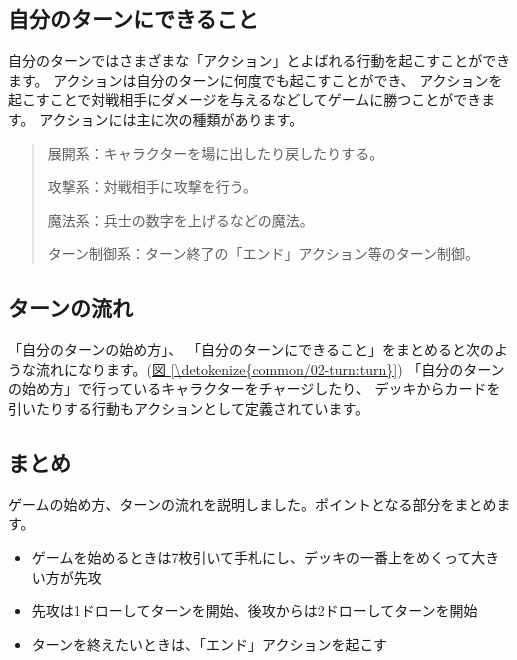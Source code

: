 \documentclass[letterpaper,10pt,dvipdfmx]{sphinxmanual}
\begin{document}
\subsection{自分のターンにできること}
\label{\detokenize{common/02-turn:id4}}
自分のターンではさまざまな「アクション」とよばれる行動を起こすことができます。
アクションは自分のターンに何度でも起こすことができ、
アクションを起こすことで対戦相手にダメージを与えるなどしてゲームに勝つことができます。
アクションには主に次の種類があります。
\begin{quote}

展開系：キャラクターを場に出したり戻したりする。

攻撃系：対戦相手に攻撃を行う。

魔法系：兵士の数字を上げるなどの魔法。

ターン制御系：ターン終了の「エンド」アクション等のターン制御。
\end{quote}


\subsection{ターンの流れ}
\label{\detokenize{common/02-turn:id5}}
「自分のターンの始め方」、
「自分のターンにできること」をまとめると次のような流れになります。(\hyperref[\detokenize{common/02-turn:turn}]{図 \ref{\detokenize{common/02-turn:turn}}})
「自分のターンの始め方」で行っているキャラクターをチャージしたり、
デッキからカードを引いたりする行動もアクションとして定義されています。

\begin{figure}[htbp]
\centering

\noindent{}
\end{figure}


\subsection{まとめ}
\label{\detokenize{common/02-turn:id6}}
ゲームの始め方、ターンの流れを説明しました。ポイントとなる部分をまとめます。
\begin{itemize}
\item {} 
ゲームを始めるときは7枚引いて手札にし、デッキの一番上をめくって大きい方が先攻

\item {} 
先攻は1ドローしてターンを開始、後攻からは2ドローしてターンを開始

\item {} 
ターンを終えたいときは、「エンド」アクションを起こす

\end{itemize}
\end{document}
